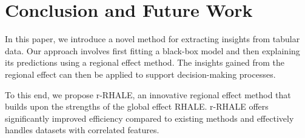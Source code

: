 \documentclass[
twocolumn,
]{ceurart}
\begin{document}
  
\section{Conclusion and Future Work}

In this paper, we introduce a novel method for extracting insights from tabular data. Our approach involves first fitting a black-box model and then explaining its predictions using a regional effect method. The insights gained from the regional effect can then be applied to support decision-making processes.

To this end, we propose r-RHALE, an innovative regional effect method that builds upon the strengths of the global effect RHALE. r-RHALE offers significantly improved efficiency compared to existing methods and effectively handles datasets with correlated features.


\end{document}
